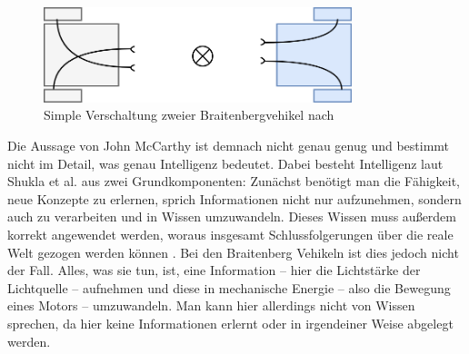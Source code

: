             \begin{figure}[h]
                \begin{center}
                    \includegraphics[width=0.8\textwidth]{figures/braitenberg-roboter.png}
                    \caption[Verschaltung Braitenberg-Vehikel]{Simple Verschaltung zweier Braitenbergvehikel nach \cite{ertel2016grundkurs}}
                    \label{pic:braitenberg-vehikel}
                \end{center}
            \end{figure}

            Die Aussage von John McCarthy ist demnach nicht genau genug und bestimmt nicht im Detail, was genau Intelligenz
            bedeutet. Dabei besteht Intelligenz laut Shukla et al. aus zwei Grundkomponenten: Zunächst benötigt man die
            Fähigkeit, neue Konzepte zu erlernen, sprich Informationen nicht nur aufzunehmen, sondern auch zu verarbeiten
            und in Wissen umzuwandeln. Dieses Wissen muss außerdem korrekt angewendet werden, woraus insgesamt
            Schlussfolgerungen über die reale Welt gezogen werden können \cite{shukla2013applicability}. Bei den Braitenberg
            Vehikeln ist dies jedoch nicht der Fall. Alles, was sie tun, ist, eine Information -- hier die Lichtstärke der
            Lichtquelle -- aufnehmen und diese in mechanische Energie -- also die Bewegung eines Motors -- umzuwandeln.
            Man kann hier allerdings nicht von Wissen sprechen, da hier keine Informationen erlernt oder in irgendeiner
            Weise abgelegt werden.

